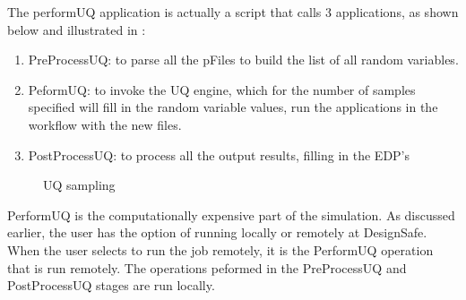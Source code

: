 The performUQ application is actually a script that calls 3
applications, as shown below and illustrated in :
\begin{enumerate}
\item PreProcessUQ: to  parse all the pFiles to build the
  list of all random variables.
\item PeformUQ: to invoke the UQ engine, which for the number of
  samples specified will fill in the random variable values, run the
  applications in the workflow with the new files.
\item PostProcessUQ: to process all the output results, filling in
  the EDP’s
\end{enumerate}

\begin{figure}[!htbp]
  \caption{UQ sampling}
  \label{fig:uq_sampling}
\end{figure}

PerformUQ is the computationally expensive part of the simulation. 
As discussed earlier, the user has the option of running
locally or remotely at DesignSafe. When the user selects to run the
job remotely, it is the PerformUQ operation that is run
remotely. The operations peformed in the PreProcessUQ and PostProcessUQ stages are run locally.
